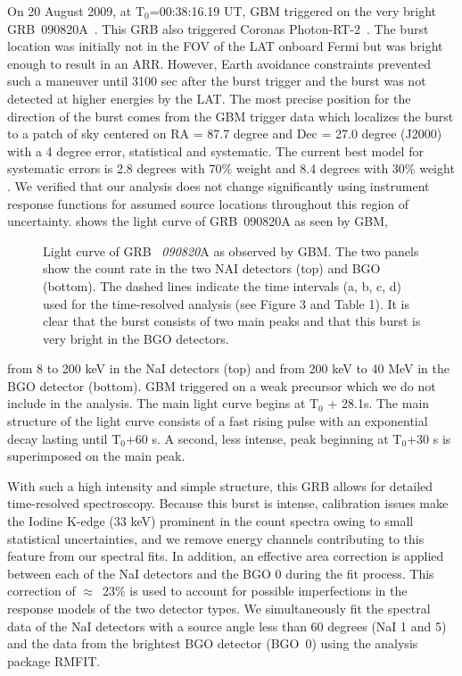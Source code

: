  On 20 August 2009, at T$_\mathrm{0}$=00:38:16.19 UT, GBM triggered on
 the very bright GRB~090820A~\cite{grb090820A}. This GRB also
 triggered Coronas Photon-RT-2~\cite{GCN-CORONAS}. The burst location
 was initially not in the FOV of the LAT onboard Fermi but was bright
 enough to result in an ARR. However, Earth avoidance constraints
 prevented such a maneuver until 3100 sec after the burst trigger and
 the burst was not detected at higher energies by the LAT.  The most
 precise position for the direction of the burst comes from the GBM
 trigger data which localizes the burst to a patch of sky centered on
 RA = 87.7 degree and Dec = 27.0 degree (J2000) with a 4 degree error,
 statistical and systematic. The current best model for systematic
 errors is 2.8 degrees with 70\% weight and 8.4 degrees with 30\%
 weight \cite{briggsann}. We verified that our analysis does not
 change significantly using instrument response functions for assumed
 source locations throughout this region of uncertainty.
  shows the light curve of GRB~090820A as seen
 by GBM,
\begin{figure}[h]
\caption{ Light curve of GRB~{\it
    090820}A as observed by GBM. The two panels show the count rate in
  the two NAI detectors (top) and BGO (bottom). The dashed lines
  indicate the time intervals (a, b, c, d) used for the time-resolved
  analysis (see Figure 3 and Table 1). It is clear that the burst
  consists of two main peaks and that this burst is very bright in the
  BGO detectors.}
\label{fig:figure1}
\end{figure}
from 8 to 200 keV in the NaI detectors (top) and from 200 keV to 40
MeV in the BGO detector (bottom). GBM triggered on a weak precursor
which we do not include in the analysis. The main light curve begins
at T$_{0}$ + 28.1s. The main structure of the light curve consists of
a fast rising pulse with an exponential decay lasting until T$_{0}$+60
s. A second, less intense, peak beginning at T$_{0}$+30 s is
superimposed on the main peak.


With such a high intensity and simple structure, this GRB allows for
detailed time-resolved spectroscopy. Because this burst is intense,
calibration issues make the Iodine K-edge (33 keV) prominent in the
count spectra owing to small statistical uncertainties, and we remove
energy channels contributing to this feature from our spectral
fits. In addition, an effective area correction is applied between
each of the NaI detectors and the BGO 0 during the fit process. This
correction of $\approx$~23\% is used to account for possible
imperfections in the response models of the two detector types.
We simultaneously fit the spectral data of the NaI detectors with a
source angle less than 60 degrees (NaI 1 and 5) and the data from the
brightest BGO detector (BGO~0) using the analysis package RMFIT.


